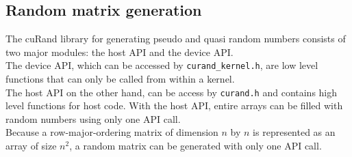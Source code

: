 \subsection*{Random matrix generation}
The cuRand library for generating pseudo and quasi random numbers consists of two major modules:
the host API and the device API.\\
The device API, which can be accessed by \texttt{curand\_kernel.h}, are low level functions that can only be called from within a kernel. \\
The host API on the other hand, can be access by \texttt{curand.h} and contains high level functions for host code. With the host API, entire arrays can be filled with random numbers using only one API call. \\
Because a row-major-ordering matrix of dimension $n$ by $n$ is represented as an array of size $n^2$, a random matrix can be generated with only one API call. 

